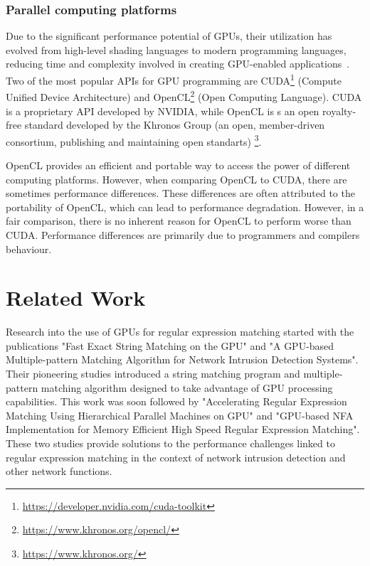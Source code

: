 \documentclass[10pt,onecolumn,twoside,english,a4paper]{article}
\begin{document}
\subsubsection{Parallel computing platforms} \label{Parallel computing platforms}
Due to the significant performance potential of GPUs, their  utilization has evolved from high-level shading languages to modern programming languages, reducing time and complexity involved in creating GPU-enabled applications~\cite{Asaduzzaman:Impact_CUDA_OpenCL}.
Two of the most popular APIs for GPU programming are CUDA\footnote{\url{https://developer.nvidia.com/cuda-toolkit}} (Compute Unified Device Architecture) and OpenCL\footnote{\url{https://www.khronos.org/opencl/}} (Open Computing Language). CUDA is a proprietary API developed by NVIDIA, while OpenCL is s an open royalty-free standard developed by the Khronos Group (an open, member-driven consortium, publishing and maintaining open standarts) \footnote{\url{https://www.khronos.org/}}.

OpenCL provides an efficient and portable way to access the power of different computing platforms. However, when comparing OpenCL to CUDA, there are sometimes performance differences. These differences are often attributed to the portability of OpenCL, which can lead to performance degradation. However, in a fair comparison, there is no inherent reason for OpenCL to perform worse than CUDA. Performance differences are primarily due to programmers and compilers behaviour\cite{Fang:Comparison-cuda-opencl}.

\section{Related Work} \label{Related work}
Research into the use of GPUs for regular expression matching started with the publications "Fast Exact String Matching on the GPU"\cite{schatz2007fast} and "A GPU-based Multiple-pattern Matching Algorithm for Network Intrusion
Detection Systems"\cite{huang2008gpu}. Their pioneering studies introduced a string matching program and multiple-pattern matching algorithm designed to take advantage of GPU processing capabilities.
This work was soon followed by "Accelerating Regular Expression Matching Using Hierarchical Parallel Machines on GPU"\cite{Lin:regex_gpu_parallel} and "GPU-based NFA Implementation for Memory Efficient High Speed Regular Expression Matching"\cite{Zu:GPU-NFA}. These two studies provide solutions to the performance challenges linked to regular expression matching in the context of network intrusion detection and other network functions.
\end{document}

